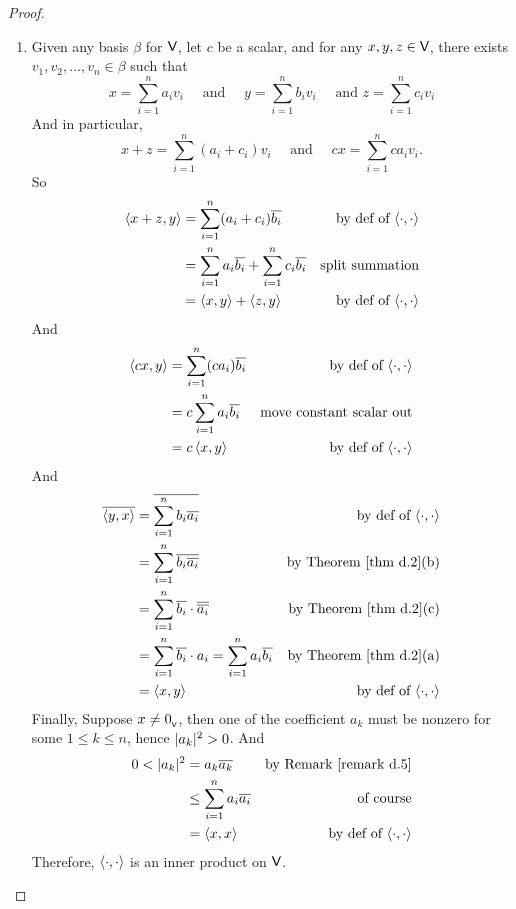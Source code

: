 \begin{proof} \ 

\begin{enumerate}
\item Given any basis \(\beta\) for \(\textsf{V}\), let \(c\) be a scalar, and for any \(x, y, z \in \textsf{V}\), there exists \(v_1, v_2, ..., v_n \in \beta\) such that
\[
    x = \sum_{i = 1}^n a_i v_i \quad \text{ and } \quad y = \sum_{i = 1}^n b_i v_i \quad \text{ and } z = \sum_{i = 1}^n c_i v_i
\]
And in particular,
\[
    x + z = \sum_{i = 1}^n (a_i + c_i) v_i \quad \text{ and } \quad cx = \sum_{i = 1}^n c a_i v_i.
\]
So
\begin{align*}
    \left< x + z, y \right> & = \sum_{i = 1}^n (a_i + c_i) \overline{b_i} & \text{by def of \(\left<\cdot, \cdot \right>\)} \\
    & = \sum_{i = 1}^n a_i \overline{b_i} + \sum_{i = 1}^n c_i \overline{b_i} & \text{split summation} \\
    & = \left< x, y \right> + \left< z, y \right> & \text{by def of \(\left<\cdot, \cdot \right>\)}
\end{align*}
And
\begin{align*}
    \left< cx, y \right> & = \sum_{i = 1}^n (ca_i) \overline{b_i} & \text{by def of \(\left<\cdot, \cdot \right>\)} \\
    & = c\sum_{i = 1}^n a_i \overline{b_i} & \text{move constant scalar out} \\
    & = c\left< x, y \right> & \text{by def of \(\left<\cdot, \cdot \right>\)}
\end{align*}
And
\begin{align*}
    \conjugatet{\LG y, x \RG} & = \conjugatet{\sum_{i = 1}^n b_i \conjugatet{a_i}} & \text{by def of \(\InnerOp\)} \\
    & = \sum_{i = 1}^n \conjugatet{b_i \conjugatet{a_i}} & \text{by \THM{d.2}(b)} \\
    & = \sum_{i = 1}^n \conjugatet{b_i} \cdot \conjugatet{\conjugatet{a_i}} & \text{by \THM{d.2}(c)} \\
    & = \sum_{i = 1}^n \conjugatet{b_i} \cdot a_i = \sum_{i = 1}^n a_i \conjugatet{b_i} & \text{by \THM{d.2}(a)} \\
    & = \LG x, y \RG & \text{by def of \(\InnerOp\)}
\end{align*}
Finally, Suppose \(x \ne 0_{_{\textsf{V}}}\), then one of the coefficient \(a_k\) must be nonzero for some \(1 \le k \le n\), hence \(\lvert a_k\rvert^2 > 0\).
And
\begin{align*}
    0 < \abs{a_k}^2 & = a_k \conjugatet{a_k} & \text{by \RMK{d.5}} \\
    & \le \sum_{i = 1}^n a_i \conjugatet{a_i} & \text{of course} \\
    & = \LG x, x \RG & \text{by def of \(\InnerOp\)}
\end{align*}
Therefore, \(\left< \cdot, \cdot \right>\) is an inner product on \(\textsf{V}\).


\end{enumerate}
\end{proof}
